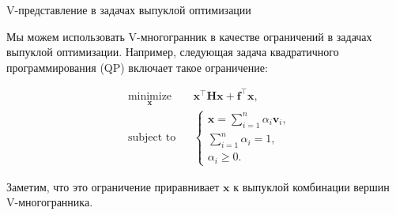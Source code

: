 \documentclass{beamer}
\begin{document}
\begin{frame}{V-представление в задачах выпуклой оптимизации}
	\begin{flushleft}
		
		Мы можем использовать V-многогранник в качестве ограничений в задачах выпуклой оптимизации. Например, следующая задача квадратичного программирования (QP) включает такое ограничение:
		
		\begin{equation}
			\begin{aligned}
				& \underset{\mathbf{x}}{\text{minimize}}
				& & \mathbf{x}^\top \mathbf{H} \mathbf{x} + \mathbf{f}^\top\mathbf{x}, \\
				& \text{subject to}
				& & \begin{cases}
					\mathbf{x} = \sum\limits_{i=1}^{n} \alpha_i  \mathbf{v}_i, \\
					\sum\limits_{i=1}^{n} \alpha_i = 1, \\
					\alpha_i \geq 0.
				\end{cases}
			\end{aligned}
		\end{equation}
		
		Заметим, что это ограничение приравнивает $\mathbf{x}$ к выпуклой комбинации вершин V-многогранника.
		
	\end{flushleft}
\end{frame}
\end{document}
